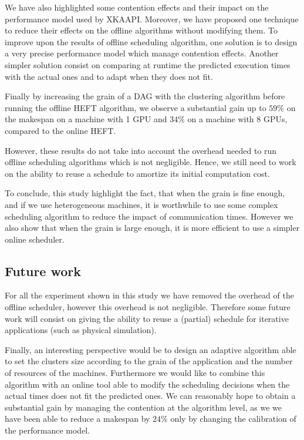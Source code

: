 \documentclass[10pt, conference, compsocconf,pdftex,dvipsnames]{IEEEtran}
\begin{document}
We have also highlighted some  contention effects and their impact on the
performance model used by XKAAPI. Moreover, we have proposed one technique to
reduce their effects on the offline algorithms without modifying them.  To
improve upon the results of offline scheduling algorithm, one solution is to
design a very precise performance model which manage contention effects.
Another simpler solution consist on comparing at runtime the predicted
execution times with the actual ones and to adapt when they does not fit.

Finally by increasing the grain of a DAG with the clustering algorithm before
running the offline HEFT algorithm, we observe a substantial gain up to $59\%$
on the makespan on a machine with 1 GPU and $34\%$ on a machine with 8 GPUs, 
compared to the online HEFT.

However, these results do not take into account the overhead needed to run
offline scheduling algorithms which is not negligible. Hence, we still need to
work on the ability to reuse a schedule to amortize its initial computation
cost. 

To conclude, this study highlight the fact, that when the grain is fine
enough, and if we use heterogeneous machines, it is worthwhile to use some 
complex scheduling algorithm to reduce the impact of communication times.
However we also show that when the grain is large enough, it is more
efficient to use a simpler online scheduler.

\subsection{Future work}
\label{chap:cncl-work}

For all the experiment shown in this study we have removed the overhead of the
offline scheduler, however this overhead is not negligible. Therefore some
future work will consist on giving the ability to reuse a (partial) schedule
for iterative applications (such as physical simulation).


Finally, an interesting perspective would be to design an adaptive algorithm
able to set the clusters size according to the grain of the application and
the number of resources of the machines. Furthermore we would like to combine
this algorithm with an online tool able to modify the scheduling decisions
when the actual times does not fit the predicted ones. We can reasonably hope
to obtain a substantial gain by managing the contention at the algorithm
level, as we we have been able to reduce a makespan by $24\%$ only by changing
the calibration of the performance model.
\end{document}
